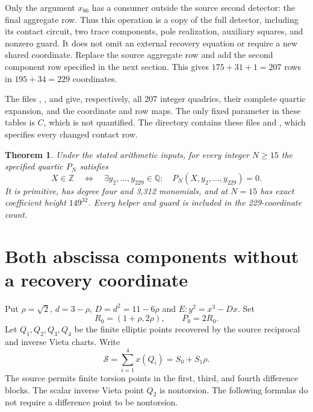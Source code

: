 \documentclass[11pt,a4paper]{article}
\newtheorem{theorem}{Theorem}[section]
\newcommand{\Q}{\mathbb Q}\newcommand{\Z}{\mathbb Z}
\begin{document}
Only the argument $x_{86}$ has a consumer outside the source second
detector: the final aggregate row. Thus this operation is a copy of
the full detector, including its contact circuit, two trace
components, pole realization, auxiliary squares, and nonzero guard.
It does not omit an external recovery equation or require a new
shared coordinate. Replace the source aggregate row and add the
second component row specified in the next section. This gives
$175+31+1=207$ rows in $195+34=229$ coordinates.

The files , , and
 give, respectively, all 207 integer quadrics,
their complete quartic expansion, and the coordinate and row maps.
The only fixed parameter in these tables is $C$, which is not
quantified. The directory
 contains these files and
, which specifies every changed contact row.

\begin{theorem}\label{thm:main}
Under the stated arithmetic inputs, for every integer $N\ge15$ the
specified quartic $P_N$ satisfies
\[
 X\in\Z\quad\Longleftrightarrow\quad
 \exists y_2,\ldots,y_{229}\in\Q:\quad
 P_N(X,y_2,\ldots,y_{229})=0.
\]
It is primitive, has degree four and 3,312 monomials, and at $N=15$
has exact coefficient height $149^{32}$. Every helper and guard is
included in the 229-coordinate count.
\end{theorem}

\section{Both abscissa components without a recovery coordinate}

Put $\rho=\sqrt2$, $d=3-\rho$, $D=d^2=11-6\rho$ and
$E:y^2=x^3-Dx$. Set
\[
 R_0=(1+\rho,2\rho),\qquad P_0=2R_0.
\]
Let $Q_1,Q_2,Q_3,Q_4$ be the finite elliptic
points recovered by the source reciprocal and inverse Vieta charts.
Write
\[
 \mathcal S=\sum_{i=1}^4 x(Q_i)=S_0+S_1\rho.
\]
The source permits finite torsion points in the first, third, and
fourth difference blocks. The scalar inverse Vieta point $Q_2$
is nontorsion. The following formulas do not require a difference
point to be nontorsion.
\end{document}
